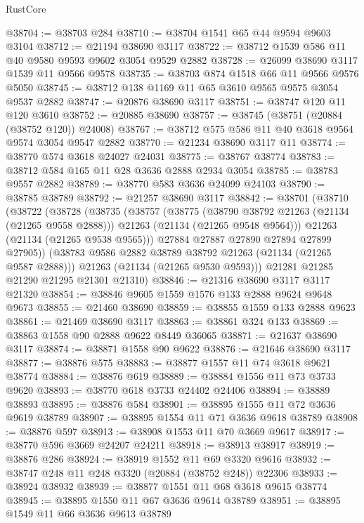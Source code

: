 \begin{lexlean}{RustCore}
\begin{coremodule}
@38704 := @38703 @284
@38710 := @38704 @1541 @65 @44 @9594 @9603 @3104
@38712 := @21194 @38690 @3117
@38722 := @38712 @1539 @586 @11 @40 @9580 @9593 @9602 @3054 @9529 @2882
@38728 := @26099 @38690 @3117 @1539 @11 @9566 @9578
@38735 := @38703 @874 @1518 @66 @11 @9566 @9576 @5050
@38745 := @38712 @138 @1169 @11 @65 @3610 @9565 @9575 @3054 @9537 @2882
@38747 := @20876 @38690 @3117
@38751 := @38747 @120 @11 @120 @3610
@38752 := @20885 @38690
@38757 := @38745 (@38751 (@20884 (@38752 @120)) @24008)
@38767 := @38712 @575 @586 @11 @40 @3618 @9564 @9574 @3054 @9547 @2882
@38770 := @21234 @38690 @3117 @11
@38774 := @38770 @574 @3618 @24027 @24031
@38775 := @38767 @38774
@38783 := @38712 @584 @165 @11 @28 @3636 @2888 @2934 @3054
@38785 := @38783 @9557 @2882
@38789 := @38770 @583 @3636 @24099 @24103
@38790 := @38785 @38789
@38792 := @21257 @38690 @3117
@38842 := @38701
    (@38710
      (@38722
        (@38728
          (@38735
            (@38757
              (@38775
                (@38790 @38792 @21263 (@21134 (@21265 @9558 @2888)))
                @21263
                (@21134 (@21265 @9548 @9564)))
              @21263
              (@21134 (@21265 @9538 @9565)))
            @27884
            @27887
            @27890
            @27894
            @27899
            @27905))
        (@38783 @9586 @2882 @38789 @38792 @21263 (@21134 (@21265 @9587 @2888)))
        @21263
        (@21134 (@21265 @9530 @9593)))
      @21281
      @21285
      @21290
      @21295
      @21301
      @21310)
@38846 := @21316 @38690 @3117 @3117 @21320
@38854 := @38846 @9605 @1559 @1576 @133 @2888 @9624 @9648 @9673
@38855 := @21460 @38690
@38859 := @38855 @1559 @133 @2888 @9623
@38861 := @21469 @38690 @3117
@38863 := @38861 @324 @133
@38869 := @38863 @1558 @90 @2888 @9622 @8449 @36065
@38871 := @21637 @38690 @3117
@38874 := @38871 @1558 @90 @9622
@38876 := @21646 @38690 @3117
@38877 := @38876 @575
@38883 := @38877 @1557 @11 @74 @3618 @9621 @38774
@38884 := @38876 @619
@38889 := @38884 @1556 @11 @73 @3733 @9620
@38893 := @38770 @618 @3733 @24402 @24406
@38894 := @38889 @38893
@38895 := @38876 @584
@38901 := @38895 @1555 @11 @72 @3636 @9619 @38789
@38907 := @38895 @1554 @11 @71 @3636 @9618 @38789
@38908 := @38876 @597
@38913 := @38908 @1553 @11 @70 @3669 @9617
@38917 := @38770 @596 @3669 @24207 @24211
@38918 := @38913 @38917
@38919 := @38876 @286
@38924 := @38919 @1552 @11 @69 @3320 @9616
@38932 := @38747 @248 @11 @248 @3320 (@20884 (@38752 @248)) @22306
@38933 := @38924 @38932
@38939 := @38877 @1551 @11 @68 @3618 @9615 @38774
@38945 := @38895 @1550 @11 @67 @3636 @9614 @38789
@38951 := @38895 @1549 @11 @66 @3636 @9613 @38789

\end{coremodule}
\end{lexlean}
